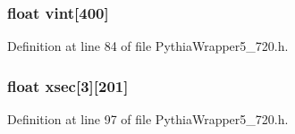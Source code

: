 \subsubsection{\setlength{\rightskip}{0pt plus 5cm}float {\bf vint}[400]}\label{PythiaWrapper5__720_8h_20a8891ada82dd1f7e1e20a351349223}




Definition at line 84 of file Pythia\-Wrapper5\_\-720.h.
\subsubsection{\setlength{\rightskip}{0pt plus 5cm}float {\bf xsec}[3][201]}\label{PythiaWrapper5__720_8h_688208897d5edac6507f5f21e04657d6}




Definition at line 97 of file Pythia\-Wrapper5\_\-720.h.